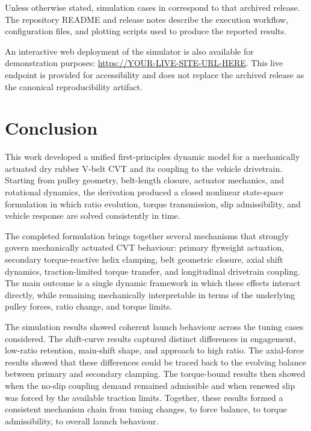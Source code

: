 \documentclass[11pt]{article}
\numberwithin{equation}{section}
\begin{document}
Unless otherwise stated, simulation cases in  correspond to
that archived release. The repository README and release notes describe the
execution workflow, configuration files, and plotting scripts used to produce
the reported results.

An interactive web deployment of the simulator is also available for
demonstration purposes:
\url{https://YOUR-LIVE-SITE-URL-HERE}.
This live endpoint is provided for accessibility and does not replace the
archived release as the canonical reproducibility artifact.

\section{Conclusion}
\label{sec:conclusion}

This work developed a unified first-principles dynamic model for a
mechanically actuated dry rubber V-belt CVT and its coupling to the vehicle
drivetrain. Starting from pulley geometry, belt-length closure, actuator
mechanics, and rotational dynamics, the derivation produced a closed nonlinear
state-space formulation in which ratio evolution, torque transmission, slip
admissibility, and vehicle response are solved consistently in time.

The completed formulation brings together several mechanisms that strongly
govern mechanically actuated CVT behaviour: primary flyweight actuation,
secondary torque-reactive helix clamping, belt geometric closure, axial shift
dynamics, traction-limited torque transfer, and longitudinal drivetrain
coupling. The main outcome is a single dynamic framework in which these effects
interact directly, while remaining mechanically interpretable in terms of the
underlying pulley forces, ratio change, and torque limits.

The simulation results showed coherent launch behaviour across the tuning cases
considered. The shift-curve results captured distinct differences in
engagement, low-ratio retention, main-shift shape, and approach to high ratio.
The axial-force results showed that these differences could be traced back to
the evolving balance between primary and secondary clamping. The torque-bound
results then showed when the no-slip coupling demand remained admissible and
when renewed slip was forced by the available traction limits. Together, these
results formed a consistent mechanism chain from tuning changes, to force
balance, to torque admissibility, to overall launch behaviour.
\end{document}
